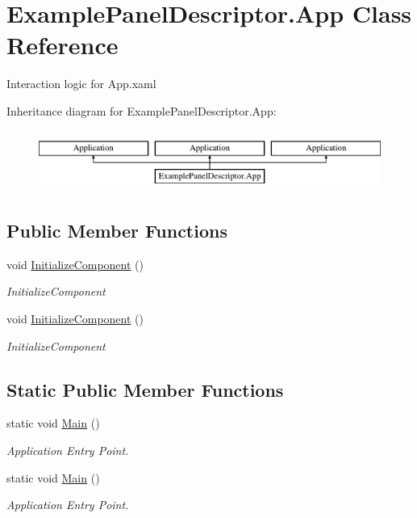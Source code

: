 \hypertarget{class_example_panel_descriptor_1_1_app}{}\section{Example\+Panel\+Descriptor.\+App Class Reference}
\label{class_example_panel_descriptor_1_1_app}


Interaction logic for App.\+xaml  


Inheritance diagram for Example\+Panel\+Descriptor.\+App\+:\begin{figure}[H]
\begin{center}
\leavevmode
\includegraphics[height=2.000000cm]{de/dac/class_example_panel_descriptor_1_1_app}
\end{center}
\end{figure}
\subsection*{Public Member Functions}
\begin{DoxyCompactItemize}
\item 
void \mbox{\hyperlink{class_example_panel_descriptor_1_1_app_a258d59dee032c2b0337bf66616f8ff96}{Initialize\+Component}} ()
\begin{DoxyCompactList}\small\item\em Initialize\+Component \end{DoxyCompactList}\item 
void \mbox{\hyperlink{class_example_panel_descriptor_1_1_app_a258d59dee032c2b0337bf66616f8ff96}{Initialize\+Component}} ()
\begin{DoxyCompactList}\small\item\em Initialize\+Component \end{DoxyCompactList}\end{DoxyCompactItemize}
\subsection*{Static Public Member Functions}
\begin{DoxyCompactItemize}
\item 
static void \mbox{\hyperlink{class_example_panel_descriptor_1_1_app_a979034e15f6742b0bc57da018b1a992d}{Main}} ()
\begin{DoxyCompactList}\small\item\em Application Entry Point. \end{DoxyCompactList}\item 
static void \mbox{\hyperlink{class_example_panel_descriptor_1_1_app_a979034e15f6742b0bc57da018b1a992d}{Main}} ()
\begin{DoxyCompactList}\small\item\em Application Entry Point. \end{DoxyCompactList}\end{DoxyCompactItemize}


